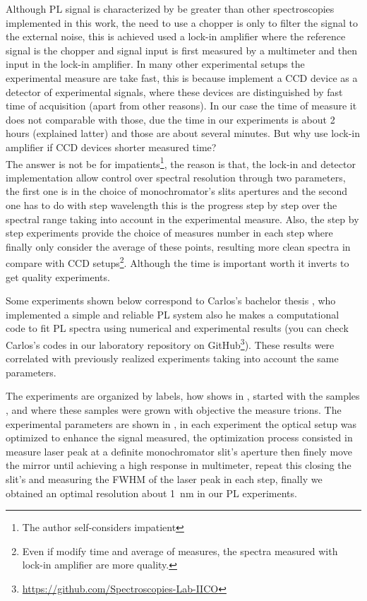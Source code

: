 Although PL signal is characterized by be greater than other spectroscopies implemented in this work, the need to use a chopper is only to filter the signal to the external noise, this is achieved used a lock-in amplifier where the reference signal is the chopper and signal input is first measured by a multimeter and then input in the lock-in amplifier. In many other experimental setups the experimental measure are take  fast,  this is because  implement a CCD device as a detector of experimental signals, where  these devices are distinguished by fast time of acquisition (apart from other reasons). In our case the time of measure it does not comparable with those, due the time in our experiments is about 2 hours (explained latter) and those are about several minutes. But why use lock-in amplifier if CCD devices shorter measured time?\\
The answer is not be for impatients\footnote{The author self-considers impatient}, the reason is that, the lock-in and detector implementation allow control over spectral resolution through two parameters, the first one is in the choice of monochromator's slits apertures and the second one has to do with step wavelength this is the  progress step by step over the spectral range taking into account in the experimental measure. Also, the step by step experiments provide the choice of measures  number in each step where finally only consider the average of these points, resulting more clean spectra in compare with CCD setups\footnote{Even if modify time and average of measures, the spectra measured with lock-in amplifier are more quality.}. Although the time is important  worth it inverts  to  get quality experiments. 

Some experiments shown below correspond to Carlos's bachelor thesis \cite{carlos2020thesis}, who implemented a simple and reliable PL system also he makes a computational code to fit PL spectra using numerical and experimental results (you can check Carlos's codes in our laboratory  repository on GitHub\footnote{\url{https://github.com/Spectroscopies-Lab-IICO}}). These results were correlated with previously   realized  experiments taking into account the same parameters. 


The experiments are organized by labels, how shows in , started with the samples ,  and  where these samples were grown with objective the measure trions. The experimental parameters are shown in , in each experiment the optical setup was optimized to enhance the signal measured, the optimization process consisted in measure laser peak at a definite monochromator slit's aperture then finely move the mirror until achieving a high response in multimeter, repeat this closing the slit's and measuring the FWHM of the laser peak in each step, finally we obtained an optimal resolution about 1 nm in our PL experiments. 


